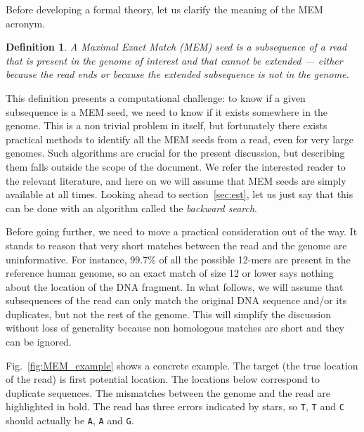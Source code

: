 \documentclass{article}
\newtheorem{definition}{Definition}
\begin{document}
Before developing a formal theory, let us clarify the meaning of the MEM
acronym.

\begin{definition}
A Maximal Exact Match (MEM) seed is a subsequence of a read that is
present in the genome of interest and that cannot be extended --- either
because the read ends or because the extended subsequence is not in the
genome.
\end{definition}

This definition presents a computational challenge: to know if a given
subsequence is a MEM seed, we need to know if it exists somewhere in the
genome. This is a non trivial problem in itself, but fortunately there
exists practical methods to identify all the MEM seeds from a read, even
for very large genomes\cite{ferragina2000opportunistic,
ferragina2005indexing}. Such algorithms are crucial for the present
discussion, but describing them falls outside the scope of the document.
We refer the interested reader to the relevant
literature\cite{pmid24336412,pmid25399029,pmid23349213,pmid19389736,
li2013aligning}, and here on we will assume that MEM seeds are simply
available at all times. Looking ahead to section~\ref{sec:est}, let
us just say that this can be done with an algorithm called the
\emph{backward search}\cite{ferragina2000opportunistic}.

Before going further, we need to move a practical consideration out of the
way. It stands to reason that very short matches between the read and the
genome are uninformative. For instance, $99.7\%$ of all the possible
12-mers are present in the reference human genome, so an exact match of
size 12 or lower says nothing about the location of the DNA fragment.
In what follows, we will assume that subsequences of the read can only
match the original DNA sequence and/or its duplicates, but not the rest of
the genome. This will simplify the discussion without loss of generality
because non homologous matches are short and they can be ignored.

Fig.~\ref{fig:MEM_example} shows a concrete example. The target (the true
location of the read) is first potential location. The locations below
correspond to duplicate sequences. The mismatches between the genome and
the read are highlighted in bold. The read has three errors indicated by
stars, so \texttt{T}, \texttt{T} and \texttt{C} should actually be
\texttt{A}, \texttt{A} and \texttt{G}.
\end{document}
